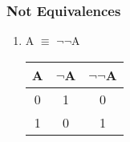 \documentclass[11pt]{article}
\begin{document}
\subsubsection{Not Equivalences}
\begin{enumerate}

  \item A $\equiv$ $\neg$$\neg$A

\begin{center}
  \begin{tabular}{| c | c | c |}
    \hline
    A & $\neg$A & $\neg$$\neg$A \\ \hline
    0 & 1 & 0 \\
    1 & 0 & 1 \\ \hline
  \end{tabular}
\end{center}

\end{enumerate}
\end{document}
